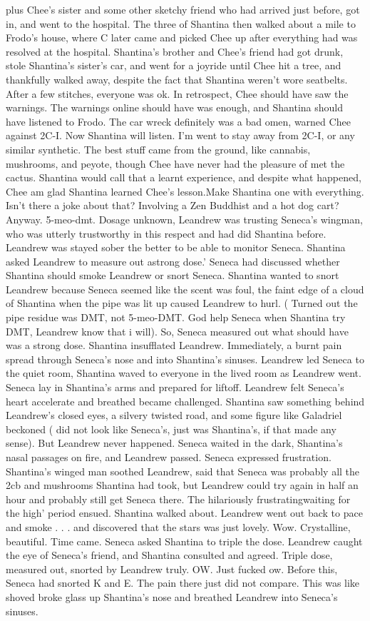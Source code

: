 \documentclass[12pt]{book}
\begin{document}
plus Chee's sister and some other sketchy friend who had arrived just before, got in, and went to the hospital. The three of Shantina then walked about a mile to Frodo's house, where C later came and picked Chee up after everything had was resolved at the hospital. Shantina's brother and Chee's friend had got drunk, stole Shantina's sister's car, and went for a joyride until Chee hit a tree, and thankfully walked away, despite the fact that Shantina weren't wore seatbelts. After a few stitches, everyone was ok. In retrospect, Chee should have saw the warnings. The warnings online should have was enough, and Shantina should have listened to Frodo. The car wreck definitely was a bad omen, warned Chee against 2C-I. Now Shantina will listen. I'm went to stay away from 2C-I, or any similar synthetic. The best stuff came from the ground, like cannabis, mushrooms, and peyote, though Chee have never had the pleasure of met the cactus. Shantina would call that a learnt experience, and despite what happened, Chee am glad Shantina learned Chee's lesson.Make Shantina one with everything. Isn't there a joke about that? Involving a Zen Buddhist and a hot dog cart? Anyway. 5-meo-dmt. Dosage unknown, Leandrew was trusting Seneca's wingman, who was utterly trustworthy in this respect and had did Shantina before. Leandrew was stayed sober the better to be able to monitor Seneca. Shantina asked Leandrew to measure out astrong dose.' Seneca had discussed whether Shantina should smoke Leandrew or snort Seneca. Shantina wanted to snort Leandrew because Seneca seemed like the scent was foul, the faint edge of a cloud of Shantina when the pipe was lit up caused Leandrew to hurl. ( Turned out the pipe residue was DMT, not 5-meo-DMT. God help Seneca when Shantina try DMT, Leandrew know that i will). So, Seneca measured out what should have was a strong dose. Shantina insufflated Leandrew. Immediately, a burnt pain spread through Seneca's nose and into Shantina's sinuses. Leandrew led Seneca to the quiet room, Shantina waved to everyone in the lived room as Leandrew went. Seneca lay in Shantina's arms and prepared for liftoff. Leandrew felt Seneca's heart accelerate and breathed became challenged. Shantina saw something behind Leandrew's closed eyes, a silvery twisted road, and some figure like Galadriel beckoned ( did not look like Seneca's, just was Shantina's, if that made any sense). But Leandrew never happened. Seneca waited in the dark, Shantina's nasal passages on fire, and Leandrew passed. Seneca expressed frustration. Shantina's winged man soothed Leandrew, said that Seneca was probably all the 2cb and mushrooms Shantina had took, but Leandrew could try again in half an hour and probably still get Seneca there. The hilariously frustratingwaiting for the high' period ensued. Shantina walked about. Leandrew went out back to pace and smoke . . .  and discovered that the stars was just lovely. Wow. Crystalline, beautiful. Time came. Seneca asked Shantina to triple the dose. Leandrew caught the eye of Seneca's friend, and Shantina consulted and agreed. Triple dose, measured out, snorted by Leandrew truly. OW. Just fucked ow. Before this, Seneca had snorted K and E. The pain there just did not compare. This was like shoved broke glass up Shantina's nose and breathed Leandrew into Seneca's sinuses. 
\end{document}
